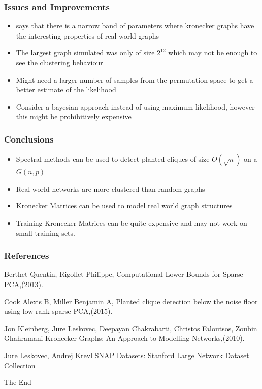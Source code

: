 \documentclass{beamer}
\begin{document}
\begin{frame}
\frametitle{Issues and Improvements}
\begin{itemize}
\item \cite{ghahramani2010} says that there is a narrow band of parameters where kronecker graphs have the interesting properties of real world graphs
\item The largest graph simulated was only of size $2^{12}$ which may not be enough to see the clustering behaviour
\item Might need a larger number of samples from the permutation space to get a better estimate of the likelihood
\item Consider a bayesian approach instead of using maximum likelihood, however this might be prohibitively expensive
\end{itemize}
\end{frame}



\begin{frame}
\frametitle{Conclusions}
\begin{itemize}
\item Spectral methods can be used to detect planted cliques of size $O(\sqrt{n})$ on a $G(n,p)$
\item Real world networks are more clustered than random graphs
\item Kronecker Matrices can be used to model real world graph structures
\item Training Kronecker Matrices can be quite expensive and may not work on small training sets.
\end{itemize}
\end{frame}


\begin{frame}
\frametitle{References}
\footnotesize{
\begin{thebibliography}{99}

Berthet Quentin,	
Rigollet Philippe,	
{Computational Lower Bounds for Sparse PCA},(2013).

Cook Alexis B,	
Miller Benjamin A,
{Planted clique detection below the noise floor using low-rank sparse PCA},(2015).

Jon Kleinberg,
Jure Leskovec,
Deepayan Chakrabarti,
Christos Faloutsos,
Zoubin Ghahramani
{Kronecker Graphs: An Approach to Modelling Networks},(2010).

Jure Leskovec,
Andrej Krevl
{{SNAP Datasets}: {Stanford} Large Network Dataset Collection}


\end{thebibliography}

}
\end{frame}


\begin{frame}
\Huge{\centerline{The End}}
\end{frame}

\end{document}
